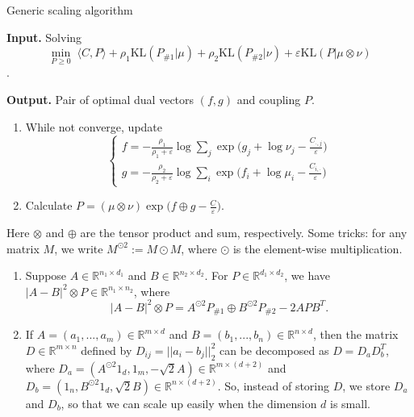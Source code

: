 \documentclass{article}
\theoremstyle{remark}
\begin{document}
\newpage
\begin{algorithm}[H]
  \caption{Generic scaling algorithm}
  \textbf{Input.} Solving
  \begin{equation*}
      \min_{P \geq 0} \; \langle C, P \rangle + \rho_1 \text{KL}(P_{\# 1} \vert \mu) + \rho_2 \text{KL}(P_{\# 2} \vert \nu) + \varepsilon \text{KL}(P \vert \mu \otimes \nu)
  \end{equation*}.

  \textbf{Output.} Pair of optimal dual vectors $(f,g)$ and coupling $P$.
  \begin{enumerate}
      \item While not converge, update
      \begin{equation*}
          \begin{cases}
            f = -\frac{\rho_1}{\rho_1 + \varepsilon} \log \sum_j \exp \big( g_j + \log \nu_j - \frac{C_{\cdot,j}}{\varepsilon} \big) \\
            g = -\frac{\rho_2}{\rho_2 + \varepsilon} \log \sum_i \exp \big( f_i + \log \mu_i - \frac{C_{i,\cdot}}{\varepsilon} \big)
          \end{cases}
      \end{equation*}
      \item Calculate $P = (\mu \otimes \nu) \exp \big(f \oplus g - \frac{C}{\varepsilon} \big)$.
  \end{enumerate}
  \label{algo:scaling}
\end{algorithm}
Here $\otimes$ and $\oplus$ are the tensor product and sum, respectively. Some tricks: for any matrix $M$, we write $M^{\odot 2} := M \odot M$, where $\odot$ is the element-wise multiplication.
\begin{enumerate}
    \item Suppose $A \in \mathbb R^{n_1 \times d_1}$ and $B \in \mathbb R^{n_2 \times d_2}$. For $P \in \mathbb R^{d_1 \times d_2}$, we have  $\vert A - B \vert^2 \otimes P \in \mathbb R^{n_1 \times n_2}$, where
    \begin{equation*}
      \vert A - B \vert^2 \otimes P = A^{\odot 2} P_{\# 1} \oplus B^{\odot 2} P_{\# 2} - 2 A P B^T.
    \end{equation*}
    
    \item If $A = (a_1,...,a_m) \in \mathbb R^{m \times d}$ and $B = (b_1,...,b_n) \in \mathbb R^{n \times d}$, then the matrix $D \in \mathbb R^{m \times n}$ defined by $D_{ij} = \vert\vert a_i - b_j \vert\vert_2^2$ can be decomposed as $D = D_a D_b^T$, where $D_a = (A^{\odot 2} 1_d, 1_m, -\sqrt{2} A) \in \mathbb R^{m \times (d+2)}$ and
    $D_b = (1_n, B^{\odot 2} 1_d, \sqrt{2} B) \in \mathbb R^{n \times (d+2)}$. So, instead of storing $D$, we store $D_a$ and $D_b$, so that we can scale up easily when the dimension $d$ is small.
\end{enumerate}
\end{document}

